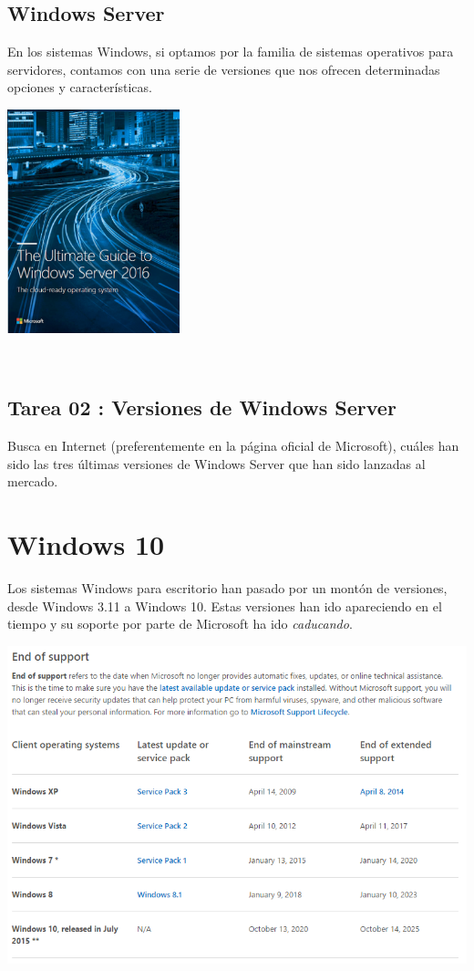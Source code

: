 \documentclass[11pt]{article}
\begin{document}
\subsection{Windows Server}
\label{sec:org650854f}

En los sistemas Windows, si optamos por la familia de sistemas
operativos para servidores, contamos con una serie de versiones que nos
ofrecen determinadas opciones y características.

\begin{center}
\includegraphics[width=5cm]{Versiones/WindowsServer_cover.png}
\end{center}  


\subsection{Tarea 02 : Versiones de Windows Server}
\label{sec:orge9d60fa}

Busca en Internet (preferentemente en la página oficial de Microsoft), cuáles han 
sido las tres últimas versiones de Windows Server que han sido lanzadas al mercado.

\newpage
\section{Windows 10}
\label{sec:org8268a8e}
Los sistemas Windows para escritorio han pasado por un montón de
versiones, desde Windows 3.11 a Windows 10. Estas versiones han ido
apareciendo en el tiempo y su soporte por parte de Microsoft ha ido
\emph{caducando}.

\begin{center}
\includegraphics[width=.9\linewidth]{Versiones/fin-soporte-windows.png}
\end{center}  
\end{document}
